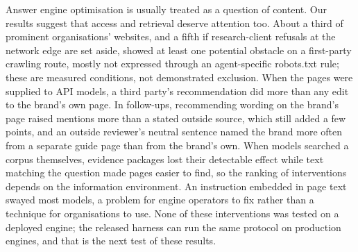Answer engine optimisation is usually treated as a question of content. Our results suggest that access and
retrieval deserve attention too. About a third of prominent organisations' websites, and a fifth if research-client
refusals at the network edge are set aside, showed at least one potential obstacle on a first-party crawling route,
mostly not expressed through an agent-specific robots.txt rule; these are measured conditions, not demonstrated
exclusion. When the pages were supplied to API models, a third party's recommendation did more than any edit to the
brand's own page. In follow-ups, recommending wording on the brand's page raised mentions more than a stated outside
source, which still added a few points, and an outside reviewer's neutral sentence named the brand more often from a
separate guide page than from the brand's own. When models searched a corpus themselves, evidence packages lost their detectable effect
while text matching the question made pages easier to find, so the ranking of interventions depends on the information
environment. An instruction embedded in page text swayed most models, a problem for engine operators to fix rather than
a technique for organisations to use. None of these interventions was tested on a deployed engine; the released harness
can run the same protocol on production engines, and that is the next test of these results.
